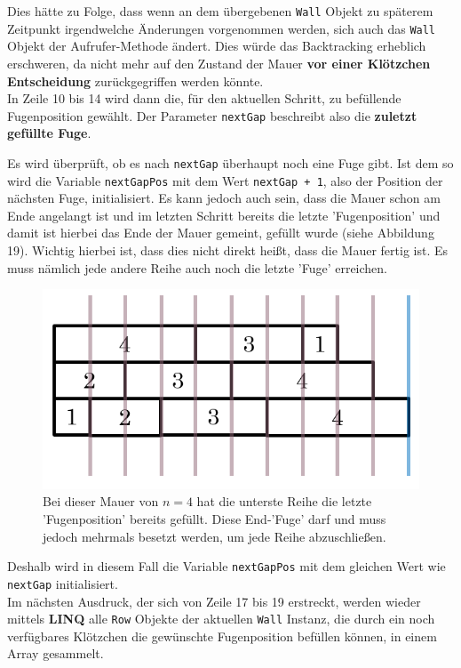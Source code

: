 \documentclass[a4paper,12pt]{article}
\newcommand{\code}{\texttt}
\begin{document}
Dies hätte zu Folge, dass wenn an dem übergebenen \code{Wall} Objekt zu späterem Zeitpunkt irgendwelche Änderungen vorgenommen werden, sich auch das \code{Wall} Objekt der Aufrufer-Methode ändert. Dies würde das Backtracking erheblich erschweren, da nicht mehr auf den Zustand der Mauer \textbf{vor einer Klötzchen Entscheidung} zurückgegriffen werden könnte.
\\[0.4cm]
In Zeile 10 bis 14 wird dann die, für den aktuellen Schritt, zu befüllende Fugenposition gewählt. Der Parameter \code{nextGap} beschreibt also die \textbf{zuletzt gefüllte Fuge}.

Es wird überprüft, ob es nach \code{nextGap} überhaupt noch eine Fuge gibt. Ist dem so wird die Variable \code{nextGapPos} mit dem Wert \code{nextGap + 1}, also der Position der nächsten Fuge, initialisiert. Es kann jedoch auch sein, dass die Mauer schon am Ende angelangt ist und im letzten Schritt bereits die letzte 'Fugenposition' und damit ist hierbei das Ende der Mauer gemeint, gefüllt wurde (siehe Abbildung 19). Wichtig hierbei ist, dass dies nicht direkt heißt, dass die Mauer fertig ist. Es muss nämlich jede andere Reihe auch noch die letzte 'Fuge' erreichen.
\begin{figure}[H]
    \centering
    \includegraphics[width=.6\linewidth]{Bilder/Aufgabe1/Code_Algorithmus_01.png}
    \caption{Bei dieser Mauer von $n = 4$ hat die unterste Reihe die letzte 'Fugenposition' bereits gefüllt. Diese End-'Fuge' darf und muss jedoch mehrmals besetzt werden, um jede Reihe abzuschließen.}
\end{figure}
Deshalb wird in diesem Fall die Variable \code{nextGapPos} mit dem gleichen Wert wie \code{nextGap} initialisiert.
\\[0.4cm]
Im nächsten Ausdruck, der sich von Zeile 17 bis 19 erstreckt, werden wieder mittels \textbf{LINQ} alle \code{Row} Objekte der aktuellen \code{Wall} Instanz, die durch ein noch verfügbares Klötzchen die gewünschte Fugenposition befüllen können, in einem Array gesammelt.
\\[0.4cm]
\end{document}
